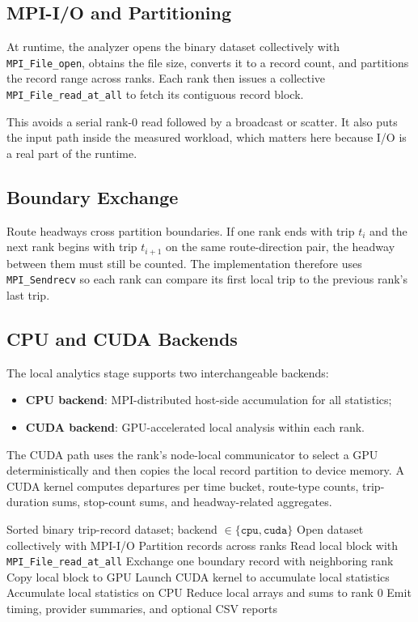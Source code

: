 \documentclass[sigconf,nonacm]{acmart}
\begin{document}
\subsection{MPI-I/O and Partitioning}
At runtime, the analyzer opens the binary dataset collectively with \texttt{MPI\_File\_open}, obtains the file size, converts it to a record count, and partitions the record range across ranks. Each rank then issues a collective \texttt{MPI\_File\_read\_at\_all} to fetch its contiguous record block.

This avoids a serial rank-0 read followed by a broadcast or scatter. It also puts the input path inside the measured workload, which matters here because I/O is a real part of the runtime.

\subsection{Boundary Exchange}
Route headways cross partition boundaries. If one rank ends with trip $t_i$ and the next rank begins with trip $t_{i+1}$ on the same route-direction pair, the headway between them must still be counted. The implementation therefore uses \texttt{MPI\_Sendrecv} so each rank can compare its first local trip to the previous rank’s last trip.

\subsection{CPU and CUDA Backends}
The local analytics stage supports two interchangeable backends:
\begin{itemize}[leftmargin=*]
  \item \textbf{CPU backend}: MPI-distributed host-side accumulation for all statistics;
  \item \textbf{CUDA backend}: GPU-accelerated local analysis within each rank.
\end{itemize}

The CUDA path uses the rank’s node-local communicator to select a GPU deterministically and then copies the local record partition to device memory. A CUDA kernel computes departures per time bucket, route-type counts, trip-duration sums, stop-count sums, and headway-related aggregates.

\begin{algorithm}[t]
\caption{Distributed Transit Analytics}
\label{alg:analysis}
\begin{algorithmic}[1]
\Require Sorted binary trip-record dataset; backend $\in \{\texttt{cpu}, \texttt{cuda}\}$
\State Open dataset collectively with MPI-I/O
\State Partition records across ranks
\State Read local block with \texttt{MPI\_File\_read\_at\_all}
\State Exchange one boundary record with neighboring rank
  \State Copy local block to GPU
  \State Launch CUDA kernel to accumulate local statistics
\Else
  \State Accumulate local statistics on CPU
\EndIf
\State Reduce local arrays and sums to rank 0
\State Emit timing, provider summaries, and optional CSV reports
\end{algorithmic}
\end{algorithm}
\end{document}
